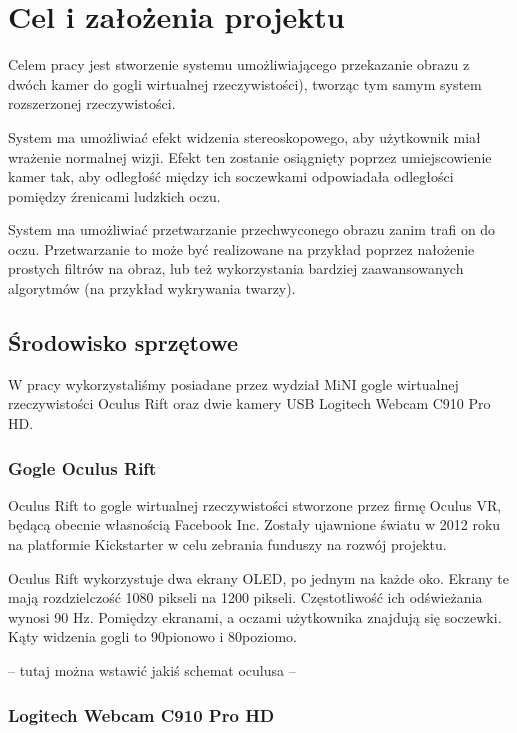 \documentclass[a4paper,11pt,twoside]{report}
\theoremstyle{definition}
\begin{document}
\chapter{Cel i założenia projektu} %

Celem pracy jest stworzenie systemu umożliwiającego przekazanie obrazu z dwóch kamer do gogli wirtualnej rzeczywistości), tworząc tym samym system rozszerzonej rzeczywistości. 

System ma umożliwiać efekt widzenia stereoskopowego, aby użytkownik miał wrażenie normalnej wizji. Efekt ten zostanie osiągnięty poprzez umiejscowienie kamer tak, aby odległość między ich soczewkami odpowiadała odległości pomiędzy źrenicami ludzkich oczu. 

System ma umożliwiać przetwarzanie przechwyconego obrazu zanim trafi on do oczu. Przetwarzanie to może być realizowane na przykład poprzez nałożenie prostych filtrów na obraz, lub też wykorzystania bardziej zaawansowanych algorytmów (na przykład wykrywania twarzy).


\section{Środowisko sprzętowe}

W pracy wykorzystaliśmy posiadane przez wydział MiNI gogle wirtualnej rzeczywistości Oculus Rift oraz dwie kamery USB Logitech Webcam C910 Pro HD.

\subsection{Gogle Oculus Rift}

Oculus Rift to gogle wirtualnej rzeczywistości stworzone przez firmę Oculus VR, będącą obecnie własnością Facebook Inc. Zostały ujawnione światu w 2012 roku na platformie Kickstarter w celu zebrania funduszy na rozwój projektu. 

Oculus Rift wykorzystuje dwa ekrany OLED, po jednym na każde oko. Ekrany te mają rozdzielczość 1080 pikseli na 1200 pikseli. Częstotliwość ich odświeżania wynosi 90 Hz. Pomiędzy ekranami, a oczami użytkownika znajdują się soczewki. Kąty widzenia gogli to 90\textdegree  pionowo i 80\textdegree  poziomo.

-- tutaj można wstawić jakiś schemat oculusa --

\subsection{Logitech Webcam C910 Pro HD}
\end{document}
